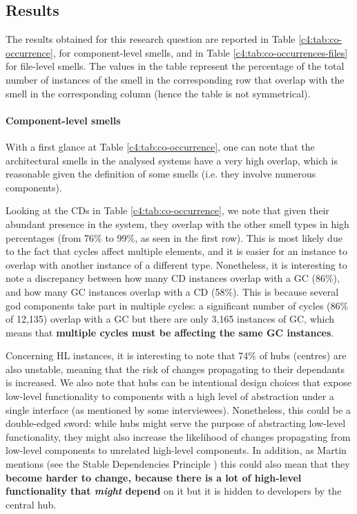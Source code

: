 \subsection{Results}\label{c4:sec:results-rq2}
The results obtained for this research question are reported in Table \ref{c4:tab:co-occurrence}, for component-level smells, and in Table \ref{c4:tab:co-occurrences-files} for file-level smells.
The values in the table represent the percentage of the total number of instances of the smell in the corresponding row that overlap with the smell in the corresponding column (hence the table is not symmetrical).

\paragraph{Component-level smells}
With a first glance at Table \ref{c4:tab:co-occurrence}, one can note that the architectural smells in the analysed systems have a very high overlap, which is reasonable given the definition of some smells (i.e. they involve numerous components).

Looking at the CDs in Table \ref{c4:tab:co-occurrence}, we note that given their abundant presence in the system, they overlap with the other smell types in high percentages (from 76\% to 99\%, as seen in the first row). 
This is most likely due to the fact that cycles affect multiple elements, and it is easier for an instance to overlap with another instance of a different type.
Nonetheless, it is interesting to note a discrepancy between how many CD instances overlap with a GC (86\%), and how many GC instances overlap with a CD (58\%). This is because several god components take part in multiple cycles: a significant number of cycles (86\% of 12,135) overlap with a GC but there are only 3,165 instances of GC, which means that \textbf{multiple cycles must be affecting the same GC instances}. 

Concerning HL instances, it is interesting to note that 74\% of hubs (centres) are also unstable, meaning that the risk of changes propagating to their dependants is increased. 
We also note that hubs can be intentional design choices that expose low-level functionality to components with a high level of abstraction under a single interface (as mentioned by some interviewees).
Nonetheless, this could be a double-edged sword: while hubs might serve the purpose of abstracting low-level functionality, they might also increase the likelihood of changes propagating from low-level components to unrelated high-level components.
In addition, as Martin mentions (see the Stable Dependencies Principle \cite{Martin2018}) this could also mean that they \textbf{become harder to change, because there is a lot of high-level functionality that \emph{might} depend} on it but it is hidden to developers by the central hub.

